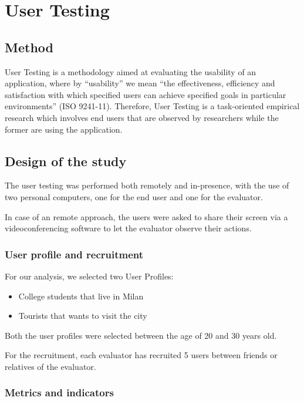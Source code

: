 
\section{User Testing}
\subsection{Method}

User Testing is a methodology aimed at evaluating the usability of an application, where by “usability” we mean “the effectiveness, efficiency and satisfaction with which specified users can achieve specified goals in particular environments” (ISO 9241-11). Therefore, User Testing is a task-oriented empirical research which involves end users that are observed by researchers while the former are using the application.

\subsection{Design of the study}
    The user testing was performed both remotely and in-presence, with the use of two personal computers, one for the end user and one for the evaluator. 
    
    In case of an remote approach, the users were asked to share their screen via a videoconferencing software to let the evaluator observe their actions.

    \subsubsection{User profile and recruitment}
    For our analysis, we selected two User Profiles:

    \begin{itemize}
        \item College students that live in Milan 
        \item Tourists that wants to visit the city
    \end{itemize}

    Both the user profiles were selected between the age of 20 and 30 years old.

    For the recruitment, each evaluator has recruited 5 users between friends or relatives of the evaluator.

    \subsubsection{Metrics and indicators}
